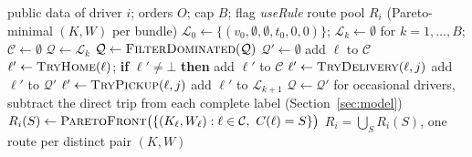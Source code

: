\documentclass[review,12pt]{elsarticle}
\theoremstyle{definition}
\theoremstyle{remark}
\begin{document}
\begin{algorithm}[!htbp]
\caption{\textsc{GenerateRoutes}$(i)$: Algorithm A for one driver}
\label{alg:routegen}
\begin{algorithmic}[1]
\Require public data of driver $i$; orders $O$; cap $B$; flag \textit{useRule}
\Ensure route pool $R_i$ (Pareto-minimal $(K,W)$ per bundle)
\State $\mathcal L_0\gets\{(v_0,\emptyset,\emptyset,t_0,0,0)\}$; $\mathcal L_k\gets\emptyset$ for $k=1,\dots,B$; $\mathcal C\gets\emptyset$
 
  \State $\mathcal Q\gets\mathcal L_k$
    \State $\mathcal Q\gets\textsc{FilterDominated}(\mathcal Q)$ 
    \State $\mathcal Q'\gets\emptyset$
        \State add $\ell$ to $\mathcal C$ 
      \EndIf
        \State $\ell'\gets\textsc{TryHome}(\ell)$; \textbf{if} $\ell'\ne\bot$ \textbf{then} add $\ell'$ to $\mathcal C$ 
      \EndIf
        \State $\ell'\gets\textsc{TryDelivery}(\ell,j)$
         add $\ell'$ to $\mathcal Q'$ \EndIf
      \EndFor
          \State $\ell'\gets\textsc{TryPickup}(\ell,j)$
           add $\ell'$ to $\mathcal L_{k+1}$ \EndIf
        \EndFor
      \EndIf
    \EndFor
    \State $\mathcal Q\gets\mathcal Q'$ 
  \EndWhile
\EndFor
\State for occasional drivers, subtract the direct trip from each complete label (Section~\ref{sec:model})
  \State $R_i(S)\gets\textsc{ParetoFront}\bigl(\{(K_\ell,W_\ell):\ell\in\mathcal C,\ C(\ell)=S\}\bigr)$ 
\EndFor
\State \Return $R_i=\bigcup_S R_i(S)$, one route per distinct pair $(K,W)$
\end{algorithmic}
\end{algorithm}
\end{document}
